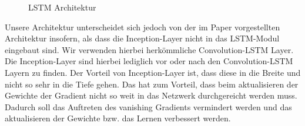 \begin{figure}[h]
 \caption{LSTM Architektur}
\label{fig:LSTM-CNN}
\end{figure}

\noindent Unsere Architektur unterscheidet sich jedoch von der im Paper vorgestellten Architektur insofern, als dass die Inception-Layer nicht in das LSTM-Modul eingebaut sind.
Wir verwenden hierbei herkömmliche Convolution-LSTM Layer. Die Inception-Layer sind hierbei lediglich vor oder nach den Convolution-LSTM Layern zu finden.
Der Vorteil von Inception-Layer ist, dass diese in die Breite und nicht so sehr in die Tiefe gehen. Das hat zum Vorteil, dass beim aktualisieren der Gewichte der Gradient nicht so weit in das Netzwerk durchgereicht werden muss. Dadurch soll das Auftreten des vanishing Gradients vermindert werden und das aktualisieren der Gewichte bzw. das Lernen verbessert werden.\\

